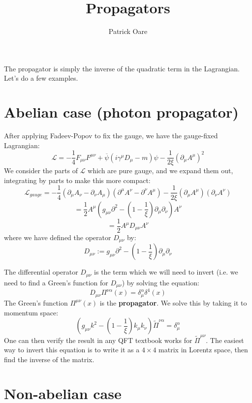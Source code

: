 \documentclass[11pt, oneside]{article}   	%
\title{Propagators}
\author{Patrick Oare}
\date{}							%
\theoremstyle{definition}
\begin{document}
\maketitle

The propagator is simply the inverse of the quadratic term in the Lagrangian. Let's do a few examples.

\section{Abelian case (photon propagator)}

After applying Fadeev-Popov to fix the gauge, we have the gauge-fixed Lagrangian:
\begin{equation}
	\mathcal L = -\frac{1}{4} F_{\mu\nu}F^{\mu\nu} + \overline\psi (i\gamma^\mu D_\mu - m)\psi -\frac{1}{2\xi} (\partial_\mu 
	A^\mu)^2
\end{equation}
We consider the parts of $\mathcal L$ which are pure gauge, and we expand them out, integrating by parts to make this more 
compact:
$$
	\mathcal L_{gauge} = -\frac{1}{4} (\partial_\mu A_\nu - \partial_\nu A_\mu) (\partial^\mu A^\nu - \partial^\nu A^\mu) - 
	\frac{1}{2\xi}(\partial_\mu A^\mu)(\partial_\nu A^\nu)
$$
$$
	= \frac{1}{2} A^\mu \left(g_{\mu\nu}\partial^2 - \left(1 - \frac{1}{\xi}\right) \partial_\mu\partial_\nu\right) A^\nu
$$
\begin{equation}
	= \frac{1}{2}A^\mu D_{\mu\nu} A^\nu
\end{equation}
where we have defined the operator $D_{\mu\nu}$ by:
\begin{equation}
	D_{\mu\nu} := g_{\mu\nu}\partial^2 - \left(1 - \frac{1}{\xi}\right)\partial_\mu\partial_\nu
\end{equation}

The differential operator $D_{\mu\nu}$ is the term which we will need to invert (i.e. we need to find a Green's function for 
$D_{\mu\nu}$) by solving the equation:
\begin{equation}
	D_{\mu\nu}\Pi^{\nu\alpha}(x) = \delta^\alpha_\mu \delta^4(x)
\end{equation}
The Green's function $\Pi^{\mu\nu}(x)$ is the \textbf{propagator}. We solve this by taking it to momentum space:
\begin{equation}
	\left(g_{\mu\nu}k^2 - \left(1 - \frac{1}{\xi}\right) k_\mu k_\nu\right)\tilde\Pi^{\nu\alpha} = \delta^\alpha_\mu
\end{equation}
One can then verify the result in any QFT textbook works for $\tilde\Pi^{\mu\nu}$. The easiest way to invert this equation is to 
write it as a $4\times 4$ matrix in Lorentz space, then find the inverse of the matrix. 

\section{Non-abelian case}
\end{document}
